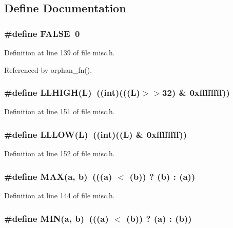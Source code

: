 \subsection{Define Documentation}
\subsubsection[{FALSE}]{\setlength{\rightskip}{0pt plus 5cm}\#define FALSE~0}\label{misc_8h_a93f0eb578d23995850d61f7d61c55c1}




Definition at line 139 of file misc.h.

Referenced by orphan\_\-fn().
\subsubsection[{LLHIGH}]{\setlength{\rightskip}{0pt plus 5cm}\#define LLHIGH(L)~((int)(((L)$>$$>$32) \& 0xffffffff))}\label{misc_8h_3b289ae60231d9e6de0addf1c7780872}




Definition at line 151 of file misc.h.
\subsubsection[{LLLOW}]{\setlength{\rightskip}{0pt plus 5cm}\#define LLLOW(L)~((int)((L) \& 0xffffffff))}\label{misc_8h_95321b23a6cc532393c77da65527755f}




Definition at line 152 of file misc.h.
\subsubsection[{MAX}]{\setlength{\rightskip}{0pt plus 5cm}\#define MAX(a, \/  b)~(((a) $<$ (b)) ? (b) : (a))}\label{misc_8h_fa99ec4acc4ecb2dc3c2d05da15d0e3f}




Definition at line 144 of file misc.h.
\subsubsection[{MIN}]{\setlength{\rightskip}{0pt plus 5cm}\#define MIN(a, \/  b)~(((a) $<$ (b)) ? (a) : (b))}\label{misc_8h_3acffbd305ee72dcd4593c0d8af64a4f}




